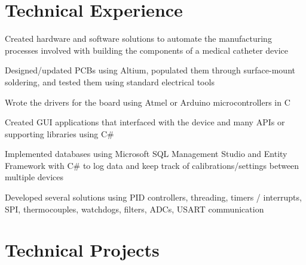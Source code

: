 \documentclass[]{aftab-resume}
\begin{document}
\begin{minipage}[t]{0.66\textwidth} 


\section{Technical Experience}
\vspace{0.15cm}


\vspace{\topsep} %
\begin{tightemize}
\item Created hardware and software solutions to automate the manufacturing processes involved with building the components of a medical catheter device
\item Designed/updated PCBs using Altium, populated them through surface-mount soldering, and tested them using standard electrical tools
\item Wrote the drivers for the board using Atmel or Arduino microcontrollers in C
\item Created GUI applications that interfaced with the device and many APIs or supporting libraries using C\#
\item Implemented databases using Microsoft SQL Management Studio and Entity Framework with C\# to log data and keep track of calibrations/settings between multiple devices
\item Developed several solutions using PID controllers, threading, timers / interrupts, SPI, thermocouples, watchdogs,
filters, ADCs, USART communication
\end{tightemize}

\vspace{0.7cm}

\section{Technical Projects}
\vspace{0.15cm}



\end{minipage}
\end{document}
